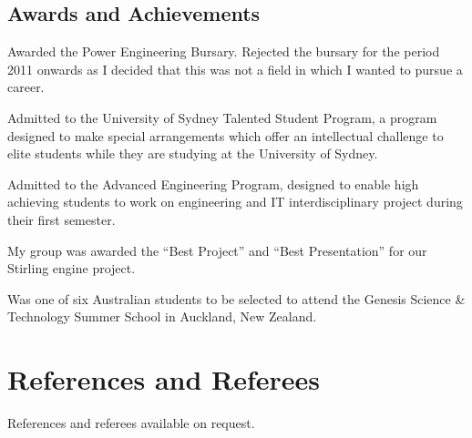\documentclass[10pt]{article}
\begin{document}
\subsection*{Awards and Achievements}
\begin{achievements}

{Awarded the  Power Engineering Bursary. 
Rejected the bursary for the period 2011 onwards as I decided that this was not 
a field in which I wanted to pursue a career.}

{Admitted to the University of Sydney Talented Student Program, a program 
designed to make special arrangements which offer an intellectual challenge to 
elite students while they are studying at the University of Sydney.}

{Admitted to the  Advanced Engineering 
Program, designed to enable high achieving students to work on engineering and 
IT interdisciplinary project during their first semester.

My group was awarded the ``Best Project'' and ``Best Presentation'' for our 
Stirling engine project.}

{Was one of six Australian students to be selected to attend the Genesis Science
\& Technology Summer School in Auckland, New Zealand.}

\end{achievements}

\section*{References and Referees}
References and referees available on request.
\end{document}
